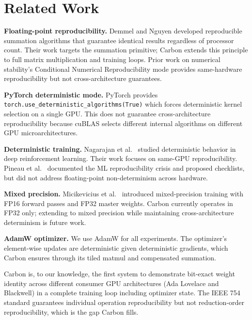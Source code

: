 \documentclass[11pt,a4paper]{article}
\begin{document}
\section{Related Work}

\textbf{Floating-point reproducibility.}
Demmel and Nguyen \cite{demmel2013ieee,demmel2015parallel} developed
reproducible summation algorithms that guarantee identical results
regardless of processor count. Their work targets the summation
primitive; Carbon extends this principle to full matrix multiplication
and training loops. Prior work on numerical stability's Conditional Numerical Reproducibility
mode \cite{higham2002accuracy} provides same-hardware reproducibility
but not cross-architecture guarantees.

\textbf{PyTorch deterministic mode.}
PyTorch \cite{paszke2019pytorch} provides
\texttt{torch.use\_deterministic\_algorithms(True)} which forces
deterministic kernel selection on a single GPU. This does not
guarantee cross-architecture reproducibility because cuBLAS
\cite{nvidia2023determinism} selects different internal algorithms
on different GPU microarchitectures.

\textbf{Deterministic training.}
Nagarajan et al.\ \cite{nagarajan2019deterministic} studied deterministic
behavior in deep reinforcement learning. Their work focuses on
same-GPU reproducibility. Pineau et al.\ \cite{pineau2021improving}
documented the ML reproducibility crisis and proposed checklists,
but did not address floating-point non-determinism across hardware.

\textbf{Mixed precision.}
Micikevicius et al.\ \cite{micikevicius2018mixed} introduced mixed-precision
training with FP16 forward passes and FP32 master weights. Carbon
currently operates in FP32 only; extending to mixed precision
while maintaining cross-architecture determinism is future work.

\textbf{AdamW optimizer.}
We use AdamW \cite{loshchilov2019adamw} for all experiments. The optimizer's
element-wise updates are deterministic given deterministic gradients,
which Carbon ensures through its tiled matmul and compensated summation.

Carbon is, to our knowledge, the first system to demonstrate bit-exact
weight identity across different consumer GPU architectures (Ada Lovelace
and Blackwell) in a complete training loop including optimizer state.
The IEEE 754 standard \cite{ieee754} guarantees individual operation
reproducibility but not reduction-order reproducibility, which is the
gap Carbon fills.
\end{document}
